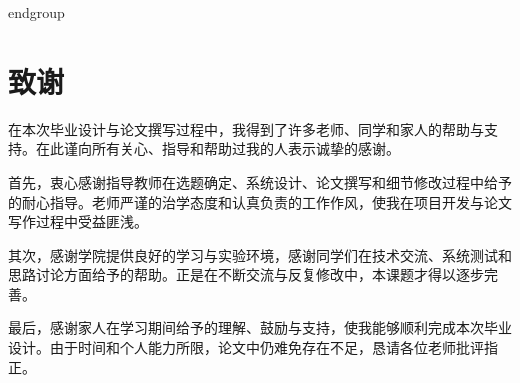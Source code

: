 \documentclass[12pt,a4paper]{ctexart}
\renewcommand{\headrulewidth}{0.4pt}
\begin{document}
endgroup

\clearpage
\pagestyle{fancy}
\fancyhf{}
\renewcommand{\headrulewidth}{0pt}
\cfoot{\thepage}
\section{致谢}
在本次毕业设计与论文撰写过程中，我得到了许多老师、同学和家人的帮助与支持。在此谨向所有关心、指导和帮助过我的人表示诚挚的感谢。

首先，衷心感谢指导教师在选题确定、系统设计、论文撰写和细节修改过程中给予的耐心指导。老师严谨的治学态度和认真负责的工作作风，使我在项目开发与论文写作过程中受益匪浅。

其次，感谢学院提供良好的学习与实验环境，感谢同学们在技术交流、系统测试和思路讨论方面给予的帮助。正是在不断交流与反复修改中，本课题才得以逐步完善。

最后，感谢家人在学习期间给予的理解、鼓励与支持，使我能够顺利完成本次毕业设计。由于时间和个人能力所限，论文中仍难免存在不足，恳请各位老师批评指正。
\end{document}
